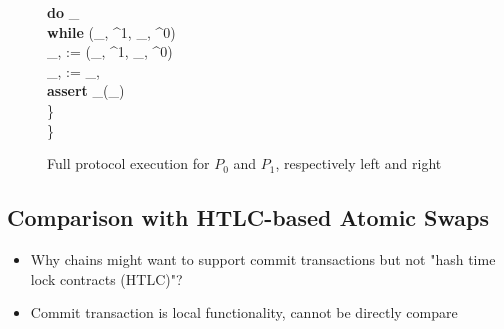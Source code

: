 \begin{figure}[t]
\begin{minipage}[t]{0.5\textwidth}
\begin{pchstack}[boxed]
{	\qquad \textbf{do} \: \st \gets {}_\bcb \\
	\qquad \textbf{while} \: \not\exists \:  \in \st \mid (\pk_{, \bcb}^1, \pk_{, \bcb}^0) \in {} \\
	\qquad \tx_{, \bcb} :=  \in \st \mid (\pk_{, \bcb}^1, \pk_{, \bcb}^0) \in {} \\
	\qquad \tx_{, \bca} :=  \oplus  \tx_{, \bcb} \\
	\qquad \textbf{assert} \: _\bca(\tx_{}) \\
        \quad \} \\
        \} \\
    }
    \end{pchstack}
    \end{minipage}%
    \caption{Full protocol execution for $P_0$ and $P_1$, respectively left and right}
    \label{fig:generic_atomic_protocol}
    \end{figure}

\subsection{Comparison with HTLC-based Atomic Swaps}
\begin{todobox}
\begin{itemize}
\item Why chains might want to support commit transactions but not "hash time lock contracts (HTLC)"? 
\item Commit transaction is local functionality, cannot be directly compare
\end{itemize}
\end{todobox}

\newpage
